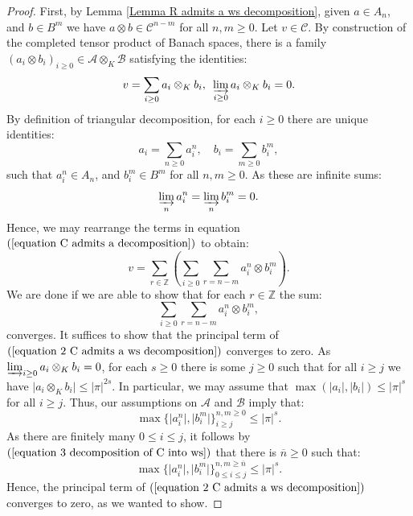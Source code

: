 \documentclass{amsart}
\begin{document}
\begin{proof}
First, by Lemma \ref{Lemma R admits a ws decomposition}, given $a\in A_n$, and $b\in B^m$ we have $a\otimes b \in \mathscr{C}^{n-m}$ for all $n,m\geq 0$. Let $v\in \mathscr{C}$. By construction of the completed tensor product of Banach spaces, there is a family $(a_i\otimes b_i)_{i\geq 0}\in \mathscr{A}\otimes_K\mathscr{B}$ satisfying the identities:
\begin{equation}\label{equation C admits a decomposition}
    v=\sum_{i\geq 0}a_i\otimes_Kb_i, \textnormal{  } \varinjlim_{i\geq 0}a_i\otimes_Kb_i=0.
\end{equation}
By definition of triangular decomposition, for each $i\geq 0$ there are unique identities:
\begin{equation*}
    a_i=\sum_{n\geq 0} a_i^n, \quad b_i=\sum_{m\geq 0} b_i^m,
\end{equation*}
such that $a_i^n\in A_n$, and $b_i^m\in B^m$ for all $n,m\geq 0$. As these are infinite sums:
\begin{equation}\label{equation 3 decomposition of C into ws}
    \varinjlim_n a_i^n=\varinjlim_n b_i^m=0.
\end{equation}
Hence, we may rearrange the terms in equation $(\ref{equation C admits a decomposition})$ to obtain:
\begin{equation*}
    v=\sum_{r\in \mathbb{Z}}\left(\sum_{i\geq 0}\sum_{r=n-m}a_i^n\otimes b_i^m  \right).
\end{equation*}
We are done if we are able to show that for each $r\in \mathbb{Z}$ the sum:
\begin{equation}\label{equation 2 C admits a ws decomposition}
    \sum_{i\geq 0}\sum_{r=n-m}a_i^n\otimes b_i^m,
\end{equation}
converges. It suffices to show that the principal term of $(\ref{equation 2 C admits a ws decomposition})$ converges to zero. As $\varinjlim_{i\geq 0}a_i\otimes_Kb_i=0$, for each $s\geq 0$ there is some $j\geq 0$ such that for all $i\geq j$ we have $\vert a_i\otimes_Kb_i \vert \leq \vert \pi \vert^{2s}$. In particular, we may assume that $\operatorname{max}(\vert a_i\vert, \vert b_i\vert)\leq \vert \pi \vert^s$ for all $i\geq j$. Thus, our assumptions on $\mathscr{A}$ and $\mathscr{B}$ imply that:
\begin{equation*}
    \operatorname{max}\{\vert a^n_i\vert, \vert b^m_i\vert\}_{i\geq j}^{n,m\geq 0}\leq \vert \pi \vert^s.
\end{equation*}
As there are finitely many $0\leq i \leq j$, it follows by $(\ref{equation 3 decomposition of C into ws})$ that there is $\overline{n}\geq 0$ such that:
\begin{equation*}
    \operatorname{max}\{\vert a^n_i\vert, \vert b^m_i\vert\}_{0\leq i\leq j}^{n,m\geq \overline{n}}\leq \vert \pi \vert^s.
\end{equation*}
Hence, the principal term of $(\ref{equation 2 C admits a ws decomposition})$ converges to zero, as we wanted to show.
\end{proof}
\end{document}
